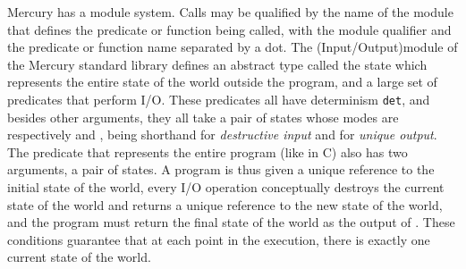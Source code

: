 

Mercury has a module system.
Calls may be qualified by the name of the module
that defines the predicate or function being called,
with the module qualifier and the predicate or function name
separated by a dot.
The \io (Input/Output)module of the Mercury standard library
defines an abstract type called the \io state
which represents the entire state of the world outside the program,
and a large set of predicates that perform I/O.
These predicates all have determinism \verb|det|,
and besides other arguments,
they all take a pair of \io states
whose modes are respectively \di and \uo,
\di being shorthand for \emph{destructive input}
and \uo for \emph{unique output}.
The  predicate that represents the entire program
(like  in C)
also has two arguments, a  pair of \io states.
A program is thus given
a unique reference to the initial state of the world,
every I/O operation conceptually destroys the current state of the world
and returns a unique reference to the new state of the world,
and the program must return the final state of the world
as the output of .
These conditions guarantee that at each point in the execution,
there is exactly one current state of the world.


